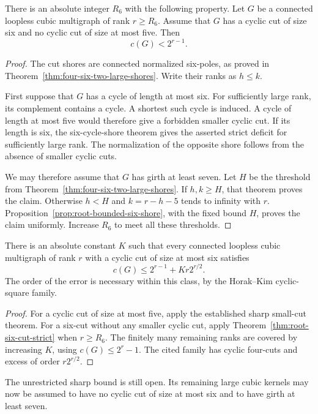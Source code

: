 \begin{theorem}
\label{thm:root-six-cut-strict}
There is an absolute integer $R_6$ with the following property.
Let $G$ be a connected loopless cubic multigraph of rank $r\ge R_6$.
Assume that $G$ has a cyclic cut of size six and no cyclic cut of size at most five.
Then
\[
 c(G)<2^{r-1}.
\]
\end{theorem}

\begin{proof}
The cut shores are connected normalized six-poles, as proved in Theorem~\ref{thm:four-six-two-large-shores}.
Write their ranks as $h\le k$.

First suppose that $G$ has a cycle of length at most six.
For sufficiently large rank, its complement contains a cycle.
A shortest such cycle is induced.
A cycle of length at most five would therefore give a forbidden smaller cyclic cut.
If its length is six, the six-cycle-shore theorem gives the asserted strict deficit for sufficiently large rank.
The normalization of the opposite shore follows from the absence of smaller cyclic cuts.

We may therefore assume that $G$ has girth at least seven.
Let $H$ be the threshold from Theorem~\ref{thm:four-six-two-large-shores}.
If $h,k\ge H$, that theorem proves the claim.
Otherwise $h<H$ and $k=r-h-5$ tends to infinity with $r$.
Proposition~\ref{prop:root-bounded-six-shore}, with the fixed bound $H$, proves the claim uniformly.
Increase $R_6$ to meet all these thresholds.
\end{proof}

\begin{corollary}
\label{cor:root-all-six-cuts-sharp}
There is an absolute constant $K$ such that every connected loopless cubic multigraph of rank $r$ with a cyclic cut of size at most six satisfies
\[
 c(G)\le2^{r-1}+K r2^{r/2}.
\]
The order of the error is necessary within this class, by the Horak--Kim cyclic-square family.
\end{corollary}

\begin{proof}
For a cyclic cut of size at most five, apply the established sharp small-cut theorem.
For a six-cut without any smaller cyclic cut, apply Theorem~\ref{thm:root-six-cut-strict} when $r\ge R_6$.
The finitely many remaining ranks are covered by increasing $K$, using $c(G)\le2^r-1$.
The cited family has cyclic four-cuts and excess of order $r2^{r/2}$.
\end{proof}

The unrestricted sharp bound is still open.
Its remaining large cubic kernels may now be assumed to have no cyclic cut of size at most six and to have girth at least seven.
